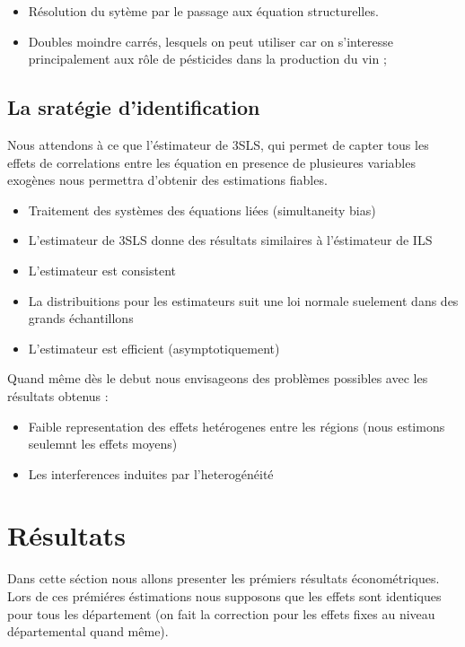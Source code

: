 \documentclass[11pt,]{article}
\providecommand{\tightlist}{%
  \setlength{\itemsep}{0pt}\setlength{\parskip}{0pt}}
\begin{document}
\begin{itemize}
  \item Résolution du sytème par le passage aux équation structurelles.
  \item Doubles moindre carrés, lesquels on peut utiliser car on s'interesse principalement aux rôle de pésticides dans la production du vin ;
\end{itemize}

\hypertarget{la-srategie-didentification}{%
\subsection{La sratégie
d'identification}\label{la-srategie-didentification}}

Nous attendons à ce que l'éstimateur de 3SLS, qui permet de capter tous
les effets de correlations entre les équation en presence de plusieures
variables exogènes nous permettra d'obtenir des estimations fiables.

\begin{itemize}
\tightlist
\item
  Traitement des systèmes des équations liées (simultaneity bias)
\item
  L'estimateur de 3SLS donne des résultats similaires à l'éstimateur de
  ILS
\item
  L'estimateur est consistent
\item
  La distribuitions pour les estimateurs suit une loi normale suelement
  dans des grands échantillons
\item
  L'estimateur est efficient (asymptotiquement)
\end{itemize}

Quand même dès le debut nous envisageons des problèmes possibles avec
les résultats obtenus :

\begin{itemize}
\tightlist
\item
  Faible representation des effets hetérogenes entre les régions (nous
  estimons seulemnt les effets moyens)
\item
  Les interferences induites par l'heterogénéité
\end{itemize}

\hypertarget{resultats}{%
\section{Résultats}\label{resultats}}

Dans cette séction nous allons presenter les prémiers résultats
économétriques. Lors de ces prémiéres éstimations nous supposons que les
effets sont identiques pour tous les département (on fait la correction
pour les effets fixes au niveau départemental quand même).
\end{document}
